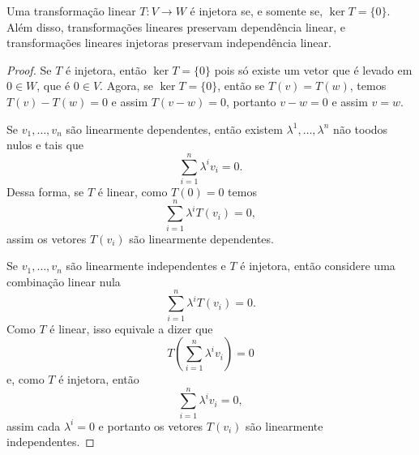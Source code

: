 \begin{proposition}
    Uma transformação linear $T \colon V \to W$ é injetora se, e somente se, $\ker T = \{0\}$. Além disso, transformações lineares preservam dependência linear, e transformações lineares injetoras preservam independência linear.
\end{proposition}
\begin{proof}
    Se $T$ é injetora, então $\ker T = \{0\}$ pois só existe um vetor que é levado em $0 \in W$, que é $0 \in V$. Agora, se $\ker T = \{0\}$, então se $T(v) = T(w)$, temos $T(v) - T(w) = 0$ e assim $T(v - w) = 0$, portanto $v - w = 0$ e assim $v = w$.

    Se $v_1, \dots, v_n$ são linearmente dependentes, então existem $\lambda^1, \dots, \lambda^n$ não toodos nulos e tais que \begin{equation}
        \sum_{i = 1}^{n} \lambda^i v_i = 0.
    \end{equation} Dessa forma, se $T$ é linear, como $T(0) = 0$ temos \begin{equation}
        \sum_{i = 1}^{n} \lambda^i T(v_i) = 0,
    \end{equation} assim os vetores $T(v_i)$ são linearmente dependentes.

    Se $v_1, \dots, v_n$ são linearmente independentes e $T$ é injetora, então considere uma combinação linear nula \begin{equation}
        \sum_{i = 1}^n \lambda^i T(v_i) = 0.
    \end{equation} Como $T$ é linear, isso equivale a dizer que \begin{equation}
        T\left(\sum_{i = 1}^n \lambda^i v_i\right) = 0
    \end{equation} e, como $T$ é injetora, então \begin{equation}
        \sum_{i = 1}^{n} \lambda^i v_i = 0,
    \end{equation} assim cada $\lambda^i = 0$ e portanto os vetores $T(v_i)$ são linearmente independentes.
\end{proof}

